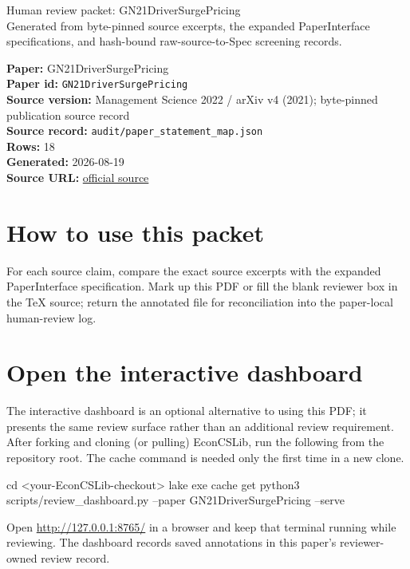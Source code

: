 \documentclass[10pt]{article}
\begin{document}
\fontsize{9}{10}\selectfont

\begin{center}
{\LARGE Human review packet: GN21DriverSurgePricing}\\[0.35em]
\small Generated from byte-pinned source excerpts, the expanded PaperInterface
specifications, and hash-bound raw-source-to-Spec screening records.
\end{center}

\noindent\textbf{Paper:} GN21DriverSurgePricing\\
\textbf{Paper id:} \texttt{GN21DriverSurgePricing}\\
\textbf{Source version:} Management Science 2022 / arXiv v4 (2021); byte-pinned publication source record\\
\textbf{Source record:} \texttt{audit/paper\_statement\_map.json}\\
\textbf{Rows:} 18\\
\textbf{Generated:} 2026-08-19\\
\textbf{Source URL:} \href{https://arxiv.org/pdf/1905.07544}{official source}





\section*{How to use this packet}
For each source claim, compare the exact source excerpts with the expanded
PaperInterface specification. Mark up this PDF or fill the blank reviewer box in the TeX source;
return the annotated file for reconciliation into the paper-local human-review
log.

\section*{Open the interactive dashboard}
The interactive dashboard is an optional alternative to using this PDF; it
presents the same review surface rather than an additional review requirement.
After forking and cloning (or pulling) EconCSLib, run the following from the
repository root. The cache command is needed only the first time in a new clone.
\begin{ReviewVerbatim}
cd <your-EconCSLib-checkout>
lake exe cache get
python3 scripts/review_dashboard.py --paper GN21DriverSurgePricing --serve
\end{ReviewVerbatim}
Open \url{http://127.0.0.1:8765/} in a browser and keep that terminal running
while reviewing. The dashboard records saved annotations in this paper's
reviewer-owned review record.
\end{document}
